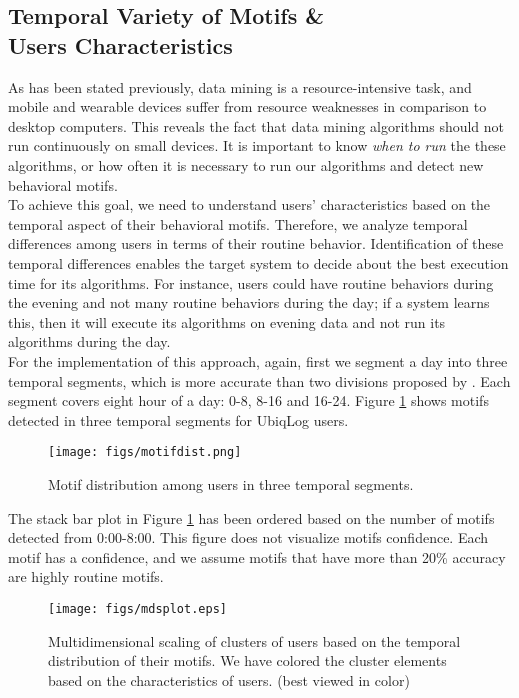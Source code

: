 \documentclass{sig-alternate}
\begin{document}
\subsection{Temporal Variety of Motifs \& \\ Users Characteristics} \label{userchar}
As has been stated previously, data mining is a resource-intensive task, and mobile and wearable devices suffer from resource weaknesses in comparison to desktop computers. This reveals the fact that data mining algorithms should not run continuously on small devices. It is important to know \emph{when to run} the these algorithms, or how often it is necessary to run our algorithms and detect new behavioral motifs. \\
To achieve this goal, we need to understand users' characteristics based on the temporal aspect of their behavioral motifs. Therefore, we analyze temporal differences among users in terms of their routine behavior. Identification of these temporal differences enables the target system to decide about the best execution time for its algorithms. For instance, users could have routine behaviors during the evening and not many routine behaviors during the day; if a system learns this, then it will execute its algorithms on evening data and not run its algorithms during the day. \\
For the implementation of this approach, again, first we segment a day into three temporal segments, which is more accurate than two divisions proposed by \cite{habitmin}. Each segment covers eight hour of a day: 0-8, 8-16 and 16-24. Figure \ref{fig:motifdist} shows motifs detected in three temporal segments for UbiqLog users. 
\begin{figure}[h]	
	\hbox{\hspace{-3ex}\texttt{[image: figs/motifdist.png]}}
	\vspace{-0.3cm}		
		\caption{\small Motif distribution among users in three temporal segments.}\label{fig:motifdist}
		\vspace{-0.2cm}
\end{figure}
The stack bar plot in Figure \ref{fig:motifdist} has been ordered based on the number of motifs detected from 0:00-8:00. This figure does not visualize motifs confidence. Each motif has a confidence, and we assume motifs that have more than 20\% accuracy are highly routine motifs. 
\vspace{-0.3cm}
\begin{figure}[h]
\begin{center}
	\texttt{[image: figs/mdsplot.eps]}
	\vspace{-0.6cm}
	\caption{\small Multidimensional scaling of clusters of users based on the temporal distribution of their motifs. We have colored the cluster elements based on the characteristics of users. (best viewed in color)}\label{fig:mds}
\vspace{-0.3cm}
\end{center}
\end{figure}
\end{document}
